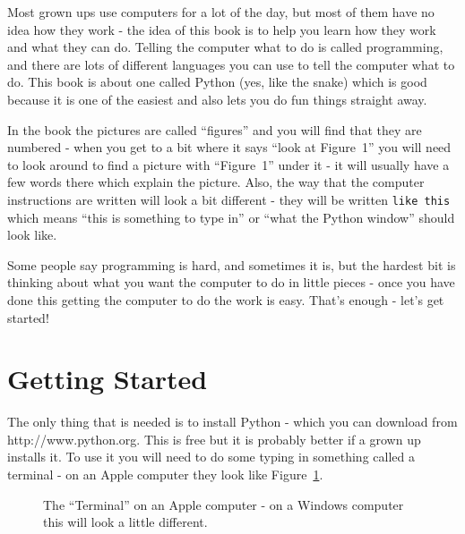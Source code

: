 \documentclass[a4paper, 11pt]{book}
\begin{document}
Most grown ups use computers for a lot of the day, but most of them
have no idea how they work - the idea of this book is to help you
learn how they work and what they can do. Telling the computer what to
do is called programming, and there are lots of different languages
you can use to tell the computer what to do. This book is about one
called Python (yes, like the snake) which is good because it is one of
the easiest and also lets you do fun things straight away. 

In the book the pictures are called ``figures'' and you will find that
they are numbered - when you get to a bit where it says ``look at
Figure~1'' you will need to look around to find a picture with
``Figure~1'' under it - it will usually have a few words there which
explain the picture. Also, the way that the computer instructions are
written will look a bit different - they will be written \verb|like this| which means ``this is something to type in'' or ``what the Python
window'' should look like.

Some people say programming is hard, and sometimes it is, but the hardest bit is thinking about what you want the computer to do in little pieces - once you have done this getting the computer to do the work is easy. That's enough - let's get started!

\section{Getting Started}

The only thing that is needed is to install Python - which you can download from http://www.python.org. This is free but it is probably better if a grown up installs it. To use it you will need to do some typing in something called a terminal - on an Apple computer they look like Figure~\ref{figure-terminal}.

\begin{figure}
\label{figure-terminal}
\centering
{}
\caption{The ``Terminal'' on an Apple computer - on a Windows computer
  this will look a little different.}
\end{figure}
\end{document}
